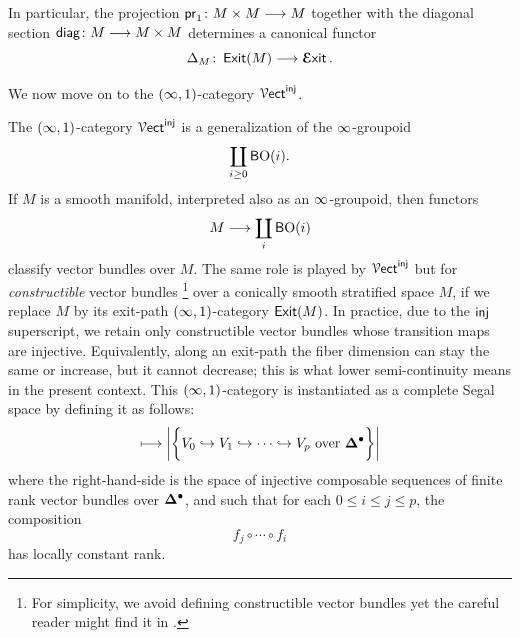 In particular, the projection $\mathsf{pr}_1\colon M\times M \longrightarrow M$ together with the diagonal section $\mathsf{diag}\colon M \longrightarrow M\times M$ determines a canonical functor
\begin{equation}
    \Delta_M \colon \operatorname{\sf Exit}(M)\longrightarrow \operatorname{\boldsymbol{\mathcal E}{\sf xit}}.
\end{equation}

We now move on to the $(\operatorname{\infty},1)$-category $\operatorname{\mathcal V{\sf ect}}^{\sf inj}$.

\begin{intuition}
The $(\operatorname{\infty},1)$-category $\operatorname{\mathcal V{\sf ect}}^{\operatorname{\mathsf{inj}}}$ is a generalization of the $\operatorname{\infty}$-groupoid 
\begin{equation}
    \coprod_{i \geq 0} \operatorname{{\mathsf BO}}(i).
\end{equation}
If $M$ is a smooth manifold, interpreted also as an $\operatorname{\infty}$-groupoid, then functors
\begin{equation}
    M \longrightarrow \coprod_{i} \operatorname{{\mathsf BO}}(i)
\end{equation}
classify vector bundles over $M$. The same role is played by $\operatorname{\mathcal V{\sf ect}}^{\operatorname{\mathsf{inj}}}$ but for \emph{constructible} vector bundles \footnote{For simplicity, we avoid defining constructible vector bundles yet the careful reader might find it in \cite[Definition~2.2]{AFR2}.} over a conically smooth stratified space $M$, if we replace $M$ by its exit-path $(\operatorname{\infty},1)$-category $\operatorname{\sf Exit}(M)$. In practice, due to the $\operatorname{\mathsf{inj}}$ superscript, we retain only constructible vector bundles whose transition maps are injective. Equivalently, along an exit-path the fiber dimension can stay the same or increase, but it cannot decrease; this is what lower semi-continuity means in the present context. This $(\operatorname{\infty},1)$-category is instantiated as a complete Segal space by defining it as follows:
\begin{equation}
    [p] \longmapsto \bigg|\bigg\{V_0 \hookra V_1 \hookra \cdots \hookra V_p \text{ over } \bDelta^{\bullet}\bigg\}\bigg|
\end{equation} 
where the right-hand-side is the space of injective composable sequences of finite rank vector bundles over $\mathbf\Delta^\bullet$, and such that for each $0\leq i \leq j \leq p$, the composition
\begin{equation}
    f_{j} \circ \cdots \circ f_{i}
\end{equation}
has locally constant rank. 
\end{intuition}

